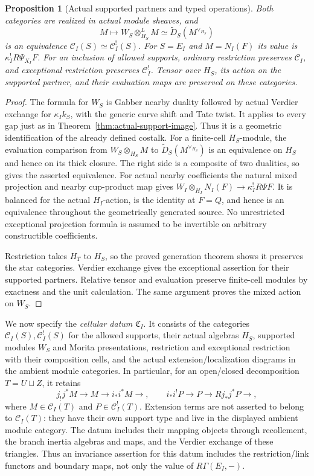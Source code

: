\documentclass[11pt]{article}
\newtheorem{proposition}[theorem]{Proposition}
\theoremstyle{definition}
\theoremstyle{remark}
\begin{document}
\begin{proposition}[Actual supported partners and typed operations]
\label{prop:cell-support}
Both categories are realized in actual module sheaves, and
\[
 M\longmapsto W_S\otimes^L_{H_S}M
 \simeq \widetilde D_S(M^{\vee_{H_S}})
\]
is an equivalence $\mathcal C_I(S)\simeq\mathcal C_I^!(S)$.
For $S=E_I$ and $M=N_I(F)$ its value is
$\kappa_I^!R\Psi_{X_I}F$.
For an inclusion of allowed supports, ordinary restriction preserves
$\mathcal C_I$, and exceptional restriction preserves
$\mathcal C_I^!$.  Tensor over $H_S$, its action on the supported
partner, and their evaluation maps are preserved on these categories.
\end{proposition}
\begin{proof}
The formula for $W_S$ is Gabber nearby duality followed by actual
Verdier exchange for $\kappa_Ik_S$, with the generic curve shift and
Tate twist.  It applies to every gap just as in
Theorem~\ref{thm:actual-support-image}.  Thus it is a geometric
identification of the already defined costalk.
For a finite-cell $H_S$-module, the evaluation comparison from
$W_S\otimes_{H_S}M$ to $\widetilde D_S(M^{\vee_{H_S}})$ is an
equivalence on $H_S$ and hence on its thick closure.  The right side
is a composite of two dualities, so gives the asserted equivalence.
For actual nearby coefficients the natural mixed projection and
nearby cup-product map gives
$W_I\otimes_{H_I}N_I(F)\to\kappa_I^!R\Psi F$.
It is balanced for the actual $H_I$-action, is the identity at $F=Q$,
and hence is an equivalence throughout the geometrically generated
source.  No unrestricted exceptional projection formula is assumed
to be invertible on arbitrary constructible coefficients.

Restriction takes $H_T$ to $H_S$, so the proved generation theorem
shows it preserves the star categories.  Verdier exchange gives the
exceptional assertion for their supported partners.  Relative tensor
and evaluation preserve finite-cell modules by exactness and the unit
calculation.  The same argument proves the mixed action on $W_S$.
\end{proof}

We now specify the \emph{cellular datum} $\mathfrak C_I$.  It consists
of the categories $\mathcal C_I(S),\mathcal C_I^!(S)$ for the allowed
supports, their actual algebras $H_S$, supported modules $W_S$ and
Morita presentations, restriction and exceptional restriction with
their composition cells, and the actual extension/localization diagrams
in the ambient module categories.  In particular, for an open/closed
decomposition $T=U\sqcup Z$, it retains
\[
 j_!j^*M\longrightarrow M\longrightarrow i_*i^*M\longrightarrow,
 \qquad
 i_*i^!P\longrightarrow P\longrightarrow Rj_*j^*P\longrightarrow,
\]
where $M\in\mathcal C_I(T)$ and $P\in\mathcal C_I^!(T)$.
Extension terms are not asserted to belong to $\mathcal C_I(T)$:
they have their own support type and live in the displayed ambient
module category.  The datum includes their mapping objects through
recollement, the branch inertia algebras and maps, and the Verdier
exchange of these triangles.  Thus an invariance assertion for this
datum includes the restriction/link functors and boundary maps, not
only the value of $R\Gamma(E_I,-)$.
\end{document}
